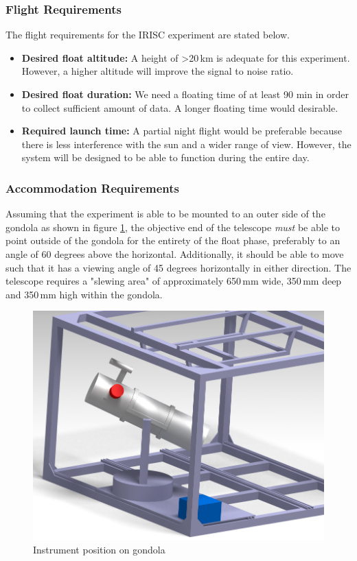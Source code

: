 \subsubsection{Flight Requirements}
The flight requirements for the IRISC experiment are stated below.
\begin{itemize}
	\item \textbf{Desired float altitude:} A height of >20\,km is adequate for this experiment. However, a higher altitude will improve the signal to noise ratio.
	\item \textbf{Desired float duration:} We need a floating time of at least 90 min in order to collect sufficient amount of data. A longer floating time would desirable.
	\item \textbf{Required launch time:} A partial night flight would be preferable because there is less interference with the sun and a wider range of view. However, the system will be designed to be able to function during the entire day.
\end{itemize}

\subsubsection{Accommodation Requirements}

Assuming that the experiment is able to be mounted to an outer side of the gondola as shown in figure \ref{accomrec}, the objective end of the telescope \textit{must} be able to point outside of the gondola for the entirety of the float phase, preferably to an angle of 60 degrees above the horizontal. Additionally, it should be able to move such that it has a viewing angle of 45 degrees horizontally in either direction. The telescope requires a "slewing area" of approximately 650\,mm wide, 350\,mm deep and 350\,mm high within the gondola.

\begin{figure}[H]
	\centering
	\includegraphics[width=0.9\linewidth]{4-experiment-design/img/interfaces/Assembly_3.png}
	\caption{Instrument position on gondola}
	\label{accomrec}
\end{figure}
